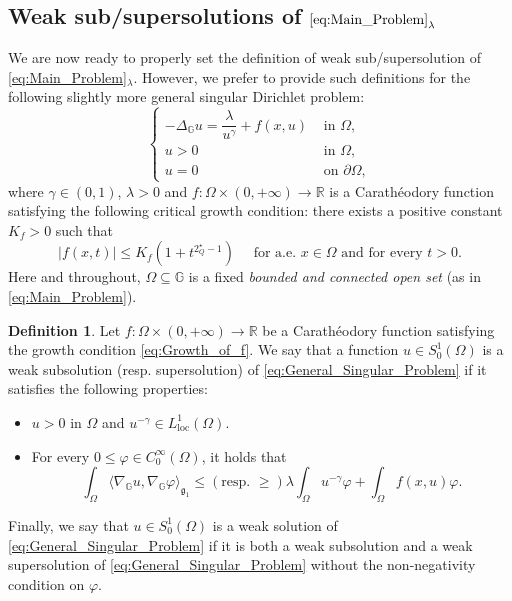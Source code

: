 \documentclass[11pt]{amsart}
\numberwithin{equation}{section} %
\theoremstyle{definition}
\newtheorem{defin}[teo]{Definition}
\begin{document}
\subsection{Weak sub/supersolutions of \texorpdfstring{$\eqref{eq:Main_Problem}_{\lambda}$}{Main Problem}}
We are now ready to properly set the definition of weak sub/supersolution of \eqref{eq:Main_Problem}$_\lambda$.
 However, we prefer to provide such definitions for the following slightly more general singular Dirichlet problem:
\begin{equation}\label{eq:General_Singular_Problem}
	\left\{\begin{array}{rl}
		-\Delta_{\mathbb{G}}u = \dfrac{\lambda}{u^{\gamma}} + f(x,u)& \textrm{ in } \Omega,\\
		u>0 & \textrm{ in } \Omega,\\
		u=0 & \textrm{ on } \partial \Omega,
	\end{array}\right.
\end{equation}
\noindent where $\gamma \in (0,1)$, $\lambda >0$ and $f: \Omega \times (0,+\infty)\to \mathbb{R}$ is a Carath\'{e}odory function satisfying the following critical growth condition: there exists a positive constant $K_{f}>0$ such that
\begin{equation}\label{eq:Growth_of_f}
	|f(x,t)|\leq K_{f} (1+t^{2^{\star}_{Q}-1})  \quad \textrm{ for a.e. } x \in \Omega \textrm{ and for  every } t>0.
\end{equation}
Here and throughout, $\Omega\subseteq\mathbb{G}$ is a fixed \emph{bounded and
connected open set} (as in \eqref{eq:Main_Problem}).
\begin{defin}\label{def:weak_sub_super_sol}
	Let $f: \Omega \times (0,+\infty)\to \mathbb{R}$ be a Carath\'{e}odory function satisfying the growth condition \eqref{eq:Growth_of_f}. We say that a function $u \in S^{1}_{0}(\Omega)$ is a weak subsolution (resp. supersolution) of \eqref{eq:General_Singular_Problem} if it satisfies the following properties:
	\begin{itemize}
		\item[(i)] $u>0$ in $\Omega$ and $u^{-\gamma} \in L^{1}_{\textrm{loc}}(\Omega)$.
		\item[(ii)] For every $0\leq \varphi \in C^{\infty}_{0}(\Omega)$, it holds that
		\begin{equation}\label{eq:weak_sub_super_sol}
			\int_{\Omega}\langle \nabla_{\mathbb{G}}u, \nabla_{\mathbb{G}}\varphi \rangle_{\mathfrak{g}_{1}} \leq (\textrm{resp. } \geq) \lambda \int_{\Omega}u^{-\gamma}\varphi + \int_{\Omega}f(x,u)\varphi.
		\end{equation}
	\end{itemize}
	Finally, we say that $u \in S^{1}_{0}(\Omega)$ is a weak solution of \eqref{eq:General_Singular_Problem} if it is both a weak subsolution and a weak supersolution of \eqref{eq:General_Singular_Problem} without the non-negativity condition on $\varphi$.
\end{defin}
\end{document}
